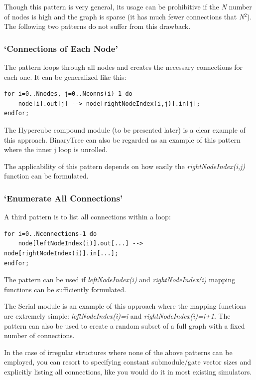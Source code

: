 Though this pattern is very general, its usage can be prohibitive if
the \textit{N} number of nodes is high and the graph is sparse (it has
much fewer connections that \textit{N}$^{\mathit{2}}$). The following
two patterns do not suffer from this drawback.


\subsubsection{`Connections of Each Node'}

The pattern loops through all nodes and creates the necessary
connections for each one. It can be generalized like this:

\begin{Verbatim}[commandchars=\\\{\}]
for i=0..Nnodes, j=0..Nconns(i)-1 do
    node[i].out[j] --> node[rightNodeIndex(i,j)].in[j];
endfor;
\end{Verbatim}

The Hypercube compound module (to be
presented later) is a clear example of this approach. BinaryTree can
also be regarded as an example of this pattern where the inner j loop
is unrolled.

The applicability of this pattern depends on how easily the \textit{rightNodeIndex(i,j)}
function can be formulated.


\subsubsection{`Enumerate All Connections'}


A third pattern is to list all connections within a loop:

\begin{Verbatim}[commandchars=\\\{\}]
for i=0..Nconnections-1 do
    node[leftNodeIndex(i)].out[...] --> node[rightNodeIndex(i)].in[...];
endfor;
\end{Verbatim}

The pattern can be used if \textit{leftNodeIndex(i)} and \textit{rightNodeIndex(i)}
mapping functions can be sufficiently formulated.

The Serial module is an example of this approach where the mapping
functions are extremely simple: \textit{leftNodeIndex(i)=i} and \textit{rightNodeIndex(i)=i+1}.
The pattern can also be used to create a random subset of a full
graph with a fixed number of connections.

In the case of irregular structures where none of the above patterns
can be employed, you can resort to specifying constant submodule/gate
vector sizes and explicitly listing all connections, like you
would do it in most existing simulators.




